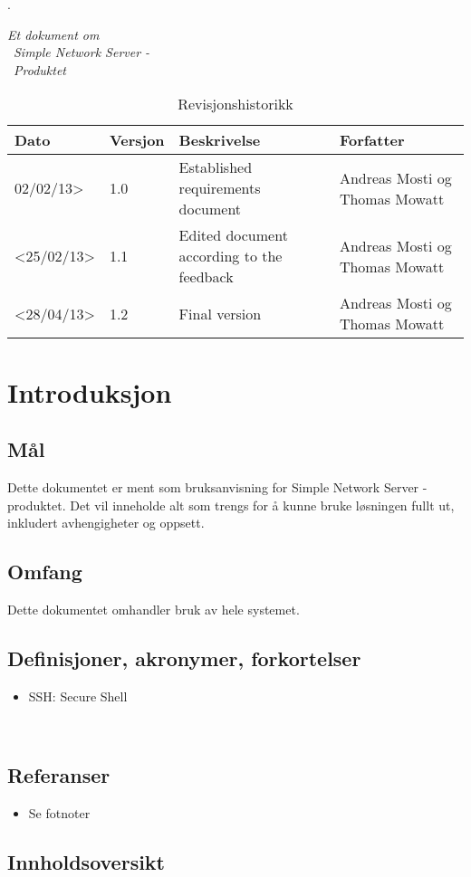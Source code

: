 \documentclass{article}
\begin{document}




\newpage
.\vfill
\begin{centering}
\LARGE


\textit{Et dokument om}  \\ 
\ \textit {Simple Network Server -} \\ 
\ \textit {Produktet}
\vspace{12cm}
\hspace{15cm}
\newpage
\end{centering} 
\pagestyle{fancy}
\setlength\headsep{30pt}


\begin{table}[h] %

\caption{Revisjonshistorikk}
	\begin{tabular}{| m{3cm} | m{1cm} | m{5cm} | m{4cm} |} 
	\hline	
	Dato & Versjon & Beskrivelse & Forfatter\\ 
	\hline
	 02/02/13> & 1.0 & Established requirements document & Andreas Mosti og Thomas Mowatt\\ 
	\hline
	<25/02/13> & 1.1 & Edited document according to the feedback & Andreas Mosti og Thomas Mowatt\\ 
	\hline
	<28/04/13> & 1.2 & Final version & Andreas Mosti og Thomas Mowatt\\ 
	\hline
	
	\end{tabular}
\end{table}

\newpage

\tableofcontents
\newpage
\section{Introduksjon}
\subsection{Mål}
Dette dokumentet er ment som bruksanvisning for Simple Network Server - produktet. Det vil inneholde alt som trengs for å kunne bruke løsningen fullt ut, inkludert avhengigheter og oppsett.
\subsection{Omfang}
Dette dokumentet omhandler bruk av hele systemet.
\subsection{Definisjoner, akronymer, forkortelser}
\begin{itemize}
\item SSH: Secure Shell
\end{itemize}
\\
\subsection{Referanser}
\begin{itemize}
\item Se fotnoter
\end{itemize}
\subsection{Innholdsoversikt}
\end{document}
